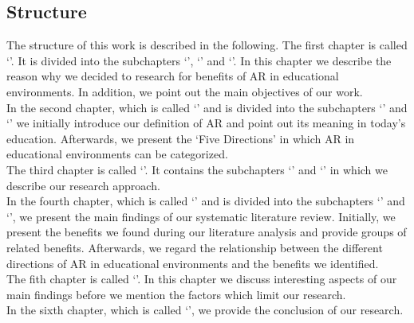 \subsection{Structure}
\label{subsec:Structure}
The structure of this work is described in the following. The first chapter is called ‘’. It is divided into the subchapters ‘’, ‘’ and ‘’. In this chapter we describe the reason why we decided to research for benefits of AR in educational environments. In addition, we point out the main objectives of our work.\\
In the second chapter, which is called ‘’ and is divided into the subchapters ‘’ and ‘’ we initially introduce our definition of AR and point out its meaning in today's education. Afterwards, we present the ‘Five Directions' \autocite [cf.][126-130]{Yuen.2011} in which AR in educational environments can be categorized.\\
The third chapter is called ‘’. It contains the subchapters ‘’ and ‘’ in which we describe our research approach.\\
In the fourth chapter, which is called ‘’ and is divided into the subchapters ‘’ and ‘’, we present the main findings of our systematic literature review. Initially, we present the benefits we found during our literature analysis and provide groups of related benefits. Afterwards, we regard the relationship between the different directions of AR in educational environments and the benefits we identified.\\
The fith chapter is called ‘’. In this chapter we discuss interesting aspects of our main findings before we mention the factors which limit our research.\\
In the sixth chapter, which is called ‘’, we provide the conclusion of our research.